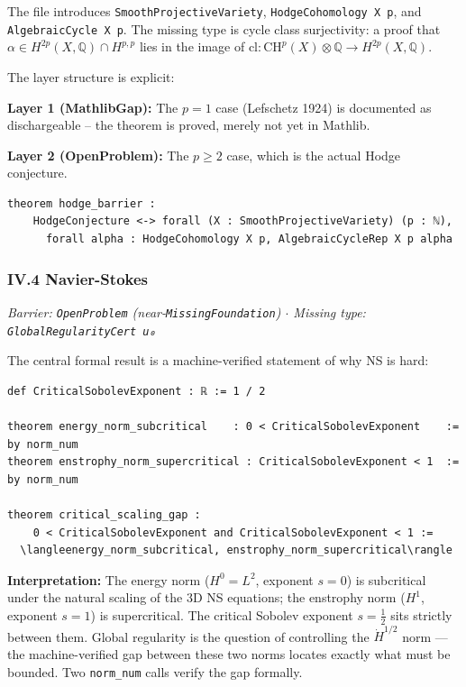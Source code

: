 \documentclass[12pt,a4paper]{article}
\begin{document}
The file introduces \texttt{SmoothProjectiveVariety}, \texttt{HodgeCohomology X p}, and \texttt{AlgebraicCycle X p}. The missing type is cycle class surjectivity: a proof that $\alpha \in H^{2p}(X,\mathbb{Q}) \cap H^{p,p}$ lies in the image of $\text{cl} : \text{CH}^p(X) \otimes \mathbb{Q} \to H^{2p}(X,\mathbb{Q})$.

The layer structure is explicit:

\textbf{Layer 1 (MathlibGap):} The $p = 1$ case (Lefschetz 1924) is documented as dischargeable  --  the theorem is proved, merely not yet in Mathlib.

\textbf{Layer 2 (OpenProblem):} The $p \geq 2$ case, which is the actual Hodge conjecture.

\begin{lstlisting}[language=lean]
theorem hodge_barrier :
    HodgeConjecture <-> forall (X : SmoothProjectiveVariety) (p : ℕ),
      forall alpha : HodgeCohomology X p, AlgebraicCycleRep X p alpha
\end{lstlisting}

\subsubsection{IV.4 Navier-Stokes}

\emph{Barrier: \texttt{OpenProblem} (near-\texttt{MissingFoundation}) $\cdot$ Missing type: \texttt{GlobalRegularityCert u₀}}

The central formal result is a machine-verified statement of why NS is hard:

\begin{lstlisting}[language=lean]
def CriticalSobolevExponent : ℝ := 1 / 2

theorem energy_norm_subcritical    : 0 < CriticalSobolevExponent    := by norm_num
theorem enstrophy_norm_supercritical : CriticalSobolevExponent < 1  := by norm_num

theorem critical_scaling_gap :
    0 < CriticalSobolevExponent and CriticalSobolevExponent < 1 :=
  \langleenergy_norm_subcritical, enstrophy_norm_supercritical\rangle
\end{lstlisting}

\textbf{Interpretation:} The energy norm ($H^0 = L^2$, exponent $s = 0$) is subcritical under the natural scaling of the 3D NS equations; the enstrophy norm ($H^1$, exponent $s = 1$) is supercritical. The critical Sobolev exponent $s = \frac{1}{2}$ sits strictly between them. Global regularity is the question of controlling the $\dot{H}^{1/2}$ norm --- the machine-verified gap between these two norms locates exactly what must be bounded. Two \texttt{norm\_num} calls verify the gap formally.
\end{document}
